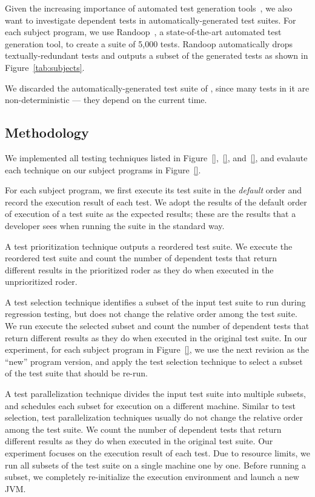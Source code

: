 Given the increasing importance of automated test generation
tools~\cite{PachecoLET2007, ZhangSBE2011, Csallner:2004, fraseretal:ISSTA:2011},
we also want to investigate dependent tests in automatically-generated
test suites. For each subject program, we use
Randoop~\cite{PachecoLET2007}, a state-of-the-art automated
test generation tool, to create a suite of 5,000 tests.
Randoop automatically drops textually-redundant tests 
and outputs a subset of the generated tests as
shown in Figure~\ref{tab:subjects}.

We discarded the automatically-generated test suite of
\jt, since many tests in it are non-deterministic ---
they depend on the current time.


\subsection{Methodology}
\label{sec:evalmethod}

We implemented all testing techniques listed
in Figure~\ref{},~\ref{}, and~\ref{}, and evalaute
each technique on our subject programs in
Figure~\ref{}.

For each subject program, we first execute its
test suite in the \textit{default} order and record
the execution result of each test.
We adopt the results of the default
order of execution of a test suite as the expected results; these
are the results that a developer sees when running the suite
in the standard way. 

A test prioritization technique outputs a reordered test suite.
We execute the reordered test suite and count the number
of dependent tests that return different results
in the prioritized roder as they do when executed in the
unprioritized roder.

A test selection technique identifies a subset of the
input test suite to run during regression testing, but does not
change the relative order among the test suite. We run execute
the selected subset and count the number of dependent tests
that return different results as they do when executed
in the original test suite. In our experiment, for each
subject program in Figure~\ref{}, we use the next revision
as the ``new'' program version, and apply the test selection
technique to select a subset of the test suite that should
be re-run.

A test parallelization technique divides the input
test suite into multiple subsets, and schedules each
subset for execution on a different machine. Similar to
test selection, test parallelization techniques usually
do not change the relative order among the test suite.
We count the number of dependent tests that return different
results as they do when executed in the original test suite.
Our experiment focuses on the execution result of each test.
Due to resource limits, we run all subsets of the test suite
on a single machine one by one. Before running a subset,
we completely re-initialize the execution environment and launch
a new JVM.

